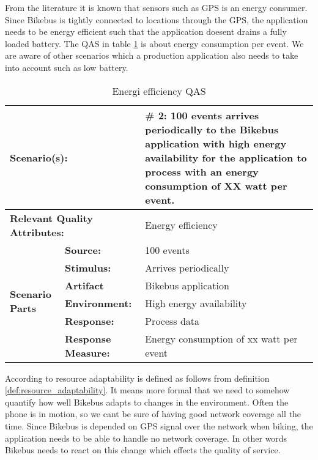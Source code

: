 From the literature \cite{Kjaergaard2010} it is known that sensors such as GPS is an energy consumer. Since Bikebus is tightly connected to locations through the GPS, the application needs to be energy efficient such that the application doesent drains a fully loaded battery. The QAS in table \ref{table:energi_efficiency_qas} is about energy consumption per event. We are aware of other scenarios which a production application also needs to take into account such as low battery.

\begin{table}[H]
\begin{center}
\begin{tabular}{|p{0.3cm}|p{2.5cm}|p{8cm}|}
  \hline
  \multicolumn{2}{|p{3cm}|}{\bfseries Scenario(s):} & \#  2: 100  events arrives periodically to the Bikebus application with high energy availability for the application to process with an energy consumption of  XX watt per event. \\
  \hline
  \multicolumn{2}{|p{3cm}|}{\bfseries Relevant Quality Attributes:} & Energy efficiency\\
  \hline
  \multirow{6}{*}{\begin{sideways}{\bfseries Scenario Parts}\end{sideways}}
  & {\bfseries Source:} & 100 events \\
  \cline{2-3}
  & {\bfseries Stimulus:} & Arrives periodically \\
  \cline{2-3}
  & {\bfseries Artifact} &  Bikebus application \\
  \cline{2-3}
  & {\bfseries Environment:} &  High energy availability \\
  \cline{2-3}
  & {\bfseries Response:} &  Process data\\
  \cline{2-3}
  & {\bfseries Response Measure:} & Energy consumption of xx watt per event \\
  \hline
\end{tabular}
\caption{Energi efficiency QAS}
\label{table:energi_efficiency_qas}
\end{center}
\end{table}

According to \cite{Kjaergaard:2015:AQT:2737182.2737196} resource adaptability is defined as follows from definition \ref{def:resource_adaptability}. It means more formal that we need to somehow quantify how well Bikebus adapts to changes in the environment. Often the phone is in motion, so we cant be sure of having good network coverage all the time. Since Bikebus is depended on GPS signal over the network when biking, the application needs to be able to handle no network coverage. In other words Bikebus needs to react on this change which effects the quality of service.    

